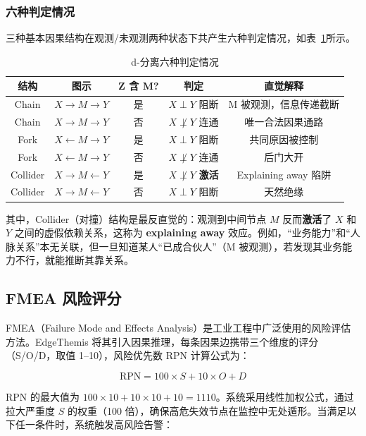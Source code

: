 \documentclass[12pt, a4paper]{ctexart}
\begin{document}
\subsubsection{六种判定情况}

三种基本因果结构在观测/未观测两种状态下共产生六种判定情况，如表~\ref{tab:6cases}所示。

\begin{table}[htbp]
\centering
\caption{d-分离六种判定情况}
\label{tab:6cases}
\begin{tabular}{ccccc}
\toprule
\textbf{结构} & \textbf{图示} & \textbf{Z 含 M?} & \textbf{判定} & \textbf{直觉解释} \\
\midrule
Chain & $X \to M \to Y$ & 是 & $X \perp Y$ 阻断 & M 被观测，信息传递截断 \\
Chain & $X \to M \to Y$ & 否 & $X \not\perp Y$ 连通 & 唯一合法因果通路 \\
Fork & $X \leftarrow M \to Y$ & 是 & $X \perp Y$ 阻断 & 共同原因被控制 \\
Fork & $X \leftarrow M \to Y$ & 否 & $X \not\perp Y$ 连通 & 后门大开 \\
Collider & $X \to M \leftarrow Y$ & 是 & $X \not\perp Y$ \textbf{激活} & Explaining away 陷阱 \\
Collider & $X \to M \leftarrow Y$ & 否 & $X \perp Y$ 阻断 & 天然绝缘 \\
\bottomrule
\end{tabular}
\end{table}

其中，Collider（对撞）结构是最反直觉的：观测到中间节点 $M$ 反而\textbf{激活}了 $X$ 和 $Y$ 之间的虚假依赖关系，这称为 \textbf{explaining away} 效应。例如，``业务能力''和``人脉关系''本无关联，但一旦知道某人``已成合伙人''（M 被观测），若发现其业务能力不行，就能推断其靠关系。

\subsection{FMEA 风险评分}

FMEA（Failure Mode and Effects Analysis）是工业工程中广泛使用的风险评估方法。EdgeThemis 将其引入因果推理，每条因果边携带三个维度的评分（S/O/D，取值 1--10），风险优先数 RPN 计算公式为：

\begin{equation}
\text{RPN} = 100 \times S + 10 \times O + D
\label{eq:rpn}
\end{equation}

RPN 的最大值为 $100 \times 10 + 10 \times 10 + 10 = 1110$。系统采用线性加权公式，通过拉大严重度 $S$ 的权重（100 倍），确保高危失效节点在监控中无处遁形。当满足以下任一条件时，系统触发高风险告警：
\end{document}
